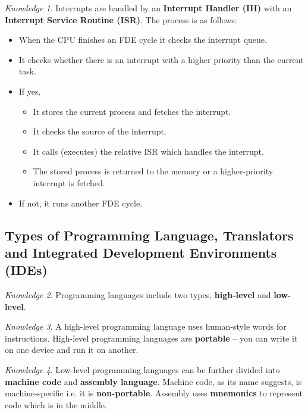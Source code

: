 \documentclass[8pt]{article}
\theoremstyle{remark}
\newtheorem{knowledge}{Knowledge}[subsection]
\begin{document}
            \begin{knowledge}
                Interrupts are handled by an \textbf{Interrupt Handler (IH)} with an \textbf{Interrupt Service Routine (ISR)}. The process is as follows:
                \begin{itemize}
                    \item When the CPU finishes an FDE cycle it checks the interrupt queue.
                    \item It checks whether there is an interrupt with a higher priority than the current task.
                    \item If yes,
                    \begin{itemize}
                        \item It stores the current process and fetches the interrupt.
                        \item It checks the source of the interrupt.
                        \item It calls (executes) the relative ISR which handles the interrupt.
                        \item The stored process is returned to the memory or a higher-priority interrupt is fetched.
                    \end{itemize}
                    \item If not, it runs another FDE cycle.
                \end{itemize}
            \end{knowledge}

        \subsection{Types of Programming Language, Translators and Integrated Development Environments (IDEs)}
            \begin{knowledge}
                Programming languages include two types, \textbf{high-level} and \textbf{low-level}.
            \end{knowledge}
            
            \begin{knowledge}
                A high-level programming language uses human-style words for instructions. High-level programming languages are \textbf{portable} -- you can write it on one device and run it on another.
            \end{knowledge}

            \begin{knowledge}
                Low-level programming languages can be further divided into \textbf{machine code} and \textbf{assembly language}. Machine code, as its name suggests, is machine-specific i.e. it is \textbf{non-portable}. Assembly uses \textbf{mnemonics} to represent code which is in the middle.
            \end{knowledge}
\end{document}
